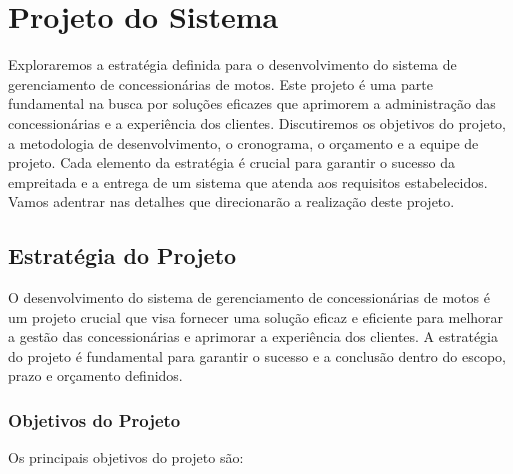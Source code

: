 
\chapter{Projeto do Sistema}

Exploraremos a estratégia definida para o desenvolvimento do sistema de gerenciamento de concessionárias de motos. Este projeto é uma parte fundamental na busca por soluções eficazes que aprimorem a administração das concessionárias e a experiência dos clientes. Discutiremos os objetivos do projeto, a metodologia de desenvolvimento, o cronograma, o orçamento e a equipe de projeto. Cada elemento da estratégia é crucial para garantir o sucesso da empreitada e a entrega de um sistema que atenda aos requisitos estabelecidos. Vamos adentrar nas detalhes que direcionarão a realização deste projeto.


\section{Estratégia do Projeto}

O desenvolvimento do sistema de gerenciamento de concessionárias de motos é um projeto crucial que visa fornecer uma solução eficaz e eficiente para melhorar a gestão das concessionárias e aprimorar a experiência dos clientes. A estratégia do projeto é fundamental para garantir o sucesso e a conclusão dentro do escopo, prazo e orçamento definidos.

\subsection{Objetivos do Projeto}

Os principais objetivos do projeto são:

